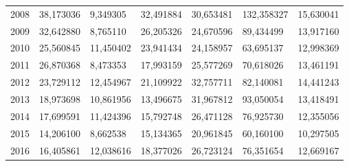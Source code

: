 \begin{table}
\begin{tabular}{p{1cm}p{2cm}p{2cm}p{2cm}p{2cm}p{2cm}p{2cm}}
 2008 &                                   38,173036 &                             9,349305 &                                          32,491884 &                      30,653481 & 132,358327 &                           15,630041 \\
 2009 &                                   32,642880 &                             8,765110 &                                          26,205326 &                      24,670596 &  89,434499 &                           13,917160 \\
 2010 &                                   25,560845 &                            11,450402 &                                          23,941434 &                      24,158957 &  63,695137 &                           12,998369 \\
 2011 &                                   26,870368 &                             8,473353 &                                          17,993159 &                      25,577269 &  70,618026 &                           13,461191 \\
 2012 &                                   23,729112 &                            12,454967 &                                          21,109922 &                      32,757711 &  82,140081 &                           14,441243 \\
 2013 &                                   18,973698 &                            10,861956 &                                          13,496675 &                      31,967812 &  93,050054 &                           13,418491 \\
 2014 &                                   17,699591 &                            11,424396 &                                          15,792748 &                      26,471128 &  76,925730 &                           12,355056 \\
 2015 &                                   14,206100 &                             8,662538 &                                          15,134365 &                      20,961845 &  60,160100 &                           10,297505 \\
 2016 &                                   16,405861 &                            12,038616 &                                          18,377026 &                      26,723124 &  76,351654 &                           12,669167 \\
\bottomrule
\end{tabular}
\end{table}

